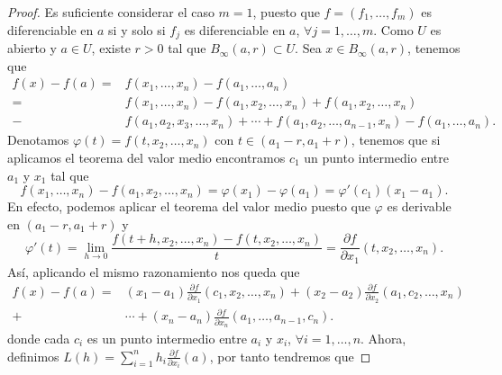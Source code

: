 \begin{proof}
Es suficiente considerar el caso $\displaystyle m = 1 $, puesto que $\displaystyle f = \left(f_{1}, \ldots, f_{m}\right) $ es diferenciable en $\displaystyle a $ si y solo si $\displaystyle f_{j}  $ es diferenciable en $\displaystyle a $, $\displaystyle \forall j = 1, \ldots, m $. Como $\displaystyle U $ es abierto y $\displaystyle a \in U $, existe $\displaystyle r > 0 $ tal que $\displaystyle B_{\infty}\left(a,r\right) \subset U $.
Sea $\displaystyle x \in B_{\infty}\left(a,r\right) $, tenemos que
\[
\begin{split}
	f\left(x\right)-f\left(a\right) = & f\left(x_{1}, \ldots, x_{n}\right) - f\left(a_{1}, \ldots, a_{n}\right) \\
	= & f\left(x_{1}, \ldots, x_{n}\right) -f\left(a_{1}, x_{2}, \ldots, x_{n}\right) + f\left(a_{1}, x_{2}, \ldots, x_{n}\right) \\
	- &  f\left(a_{1}, a_{2}, x_{3}, \ldots, x_{n}\right) + \cdots + f\left(a_{1}, a_{2}, \ldots, a_{n-1}, x_{n}\right) - f\left(a_{1}, \ldots, a_{n}\right).
\end{split}
\]
Denotamos $\displaystyle \varphi\left(t\right) = f\left(t,x_{2}, \ldots, x_{n}\right) $ con $\displaystyle t \in \left(a_{1}-r, a_{1}+r\right) $, tenemos que si aplicamos el teorema del valor medio encontramos $\displaystyle c_{1}  $ un punto intermedio entre $\displaystyle a_{1} $ y $\displaystyle x_{1} $ tal que
\[f\left(x_{1}, \ldots, x_{n}\right) -f\left(a_{1}, x_{2}, \ldots, x_{n}\right) = \varphi\left(x_{1}\right)-\varphi\left(a_{1}\right) = \varphi'\left(c_{1}\right)\left(x_{1}-a_{1}\right)   .\]
En efecto, podemos aplicar el teorema del valor medio puesto que $\displaystyle \varphi $ es derivable en $\displaystyle \left(a_{1}-r, a_{1}+r\right) $ y 
\[\varphi'\left(t\right) = \lim_{h \to 0}\frac{f\left(t+h, x_{2}, \ldots, x_{n}\right)-f\left(t, x_{2}, \ldots, x_{n}\right)}{t} = \frac{\partial f}{\partial x_{1}}\left(t, x_{2}, \ldots, x_{n}\right) .\]
Así, aplicando el mismo razonamiento nos queda que 
\[
\begin{split}
	f\left(x\right)-f\left(a\right) = & \left(x_{1}-a_{1}\right)\frac{\partial f}{\partial x_{1}}\left(c_{1}, x_{2}, \ldots, x_{n}\right) + \left(x_{2}-a_{2}\right)\frac{\partial f}{\partial x_{2}}\left(a_{1}, c_{2}, \ldots, x_{n}\right) \\
	+ &  \cdots + \left(x_{n}-a_{n}\right)\frac{\partial f}{\partial x_{n}}\left(a_{1}, \ldots, a_{n-1}, c_{n}\right) .
\end{split}
\]
donde cada $\displaystyle c_{i} $ es un punto intermedio entre $\displaystyle a_{i} $ y $\displaystyle x_{i} $, $\displaystyle \forall i = 1, \ldots, n $. Ahora, definimos $\displaystyle L\left(h\right) = \sum^{n}_{i = 1}h_{i}\frac{\partial f}{\partial x_{i}}\left(a\right) $, por tanto tendremos que

\end{proof}
